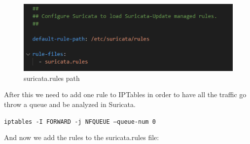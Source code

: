 \documentclass{article}
\begin{document}
\texttt{}\par
\begin{figure}[H]
    \centering
    \includegraphics[scale=0.5]{suricata/config_path.png}
    \caption{suricata.rules path}
    \label{fig:network-arc}
\end{figure}

After this we need to add one rule to IPTables in order to have all the traffic go throw a queue and be analyzed in Suricata.
\texttt{}\par
\texttt{iptables -I FORWARD -j NFQUEUE --queue-num 0}\par
\texttt{}\par
And now we add the rules to the suricata.rules file:
\end{document}
